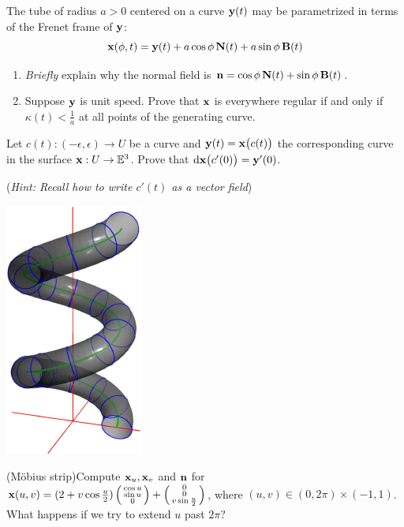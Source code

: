 \begin{exercises}
\begin{enumerate}
		
		\begin{minipage}[t]{0.75\linewidth}\vspace{-8pt}
			\item The tube of radius $a>0$ centered on a curve ${\mathbf{y}}(t)$ may be parametrized in terms of the Frenet frame of ${\mathbf{y}}$:
			\[
				{\mathbf{x}}(\phi,t)={\mathbf{y}}(t)+a\cos\phi\,{\mathbf{N}}(t)+a\sin\phi\,{\mathbf{B}}(t)
			\]
			\begin{enumerate}
			  \item \emph{Briefly} explain why the normal field is ${\mathbf{n}}=\cos\phi\,{\mathbf{N}}(t)+\sin\phi\,{\mathbf{B}}(t)$.
			  \item Suppose ${\mathbf{y}}$ is unit speed. Prove that ${\mathbf{x}}$ is everywhere regular if and only if $\kappa(t)<\frac 1a$ at all points of the generating curve.
			\end{enumerate}
		  
			\item\label{exs:tangentsurface} Let $c(t):(-\epsilon,\epsilon)\to U$ be a curve and ${\mathbf{y}}(t)={\mathbf{x}}\bigl(c(t)\bigr)$ the corresponding curve in the surface ${\mathbf{x}}:U\to\mathbb{E}^3$. Prove that $\mathrm{d}{\mathbf{x}}\bigl(c'(0)\bigr)={\mathbf{y}}'(0)$.\par
			(\emph{Hint: Recall how to write $c'(t)$ as a \emph{vector field}}) 
	  \end{minipage}
	  \hfill
	  \begin{minipage}[t]{0.22\linewidth}\vspace{-12pt}
	  	\flushright
			\href{http://www.math.uci.edu/~ndonalds/math162a/surfaces-helixtube.html}{\includegraphics{surfaces-helixtube}}
	  \end{minipage}
	  
	
		\item\label{exs:mobius} (Möbius strip)\lstsp Compute ${\mathbf{x}}_u,{\mathbf{x}}_v$ and ${\mathbf{n}}$ for ${\mathbf{x}}(u,v)=(2+v\cos\frac u2)\left(\begin{smallmatrix}\cos u\\\sin u\\0\end{smallmatrix}\right) +\left(\begin{smallmatrix}0\\0\\v\sin\frac u2\end{smallmatrix}\right)$, where $(u,v)\in (0,2\pi)\times (-1,1)$. What happens if we try to extend $u$ past $2\pi$?


\end{enumerate}
\end{exercises}
